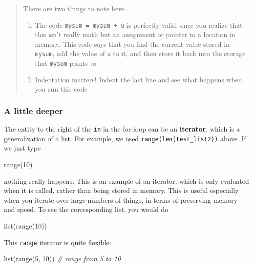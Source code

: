 \documentclass[
  letterpaper,
]{scrbook}
\newenvironment{Shaded}{\begin{snugshade}}{\end{snugshade}}
\newcommand{\BuiltInTok}[1]{#1}
\newcommand{\CommentTok}[1]{\textcolor[rgb]{0.56,0.35,0.01}{\textit{#1}}}
\newcommand{\DecValTok}[1]{\textcolor[rgb]{0.00,0.00,0.81}{#1}}
\newcommand{\NormalTok}[1]{#1}
\providecommand{\tightlist}{%
  \setlength{\itemsep}{0pt}\setlength{\parskip}{0pt}}
\begin{document}
\begin{quote}
There are two things to note here.

\begin{enumerate}
\def\labelenumi{\arabic{enumi}.}
\tightlist
\item
  The code \texttt{mysum\ =\ mysum\ +\ u} is perfectly valid, once you realize that this isn't really math but an assignment or pointer to a location in memory. This code says that you find the current value stored in \texttt{mysum}, add the value of \texttt{u} to it, and then store it back into the storage that \texttt{mysum} points to
\item
  Indentation matters! Indent the last line and see what happens when you run this code
\end{enumerate}
\end{quote}

\hypertarget{a-little-deeper}{%
\subsubsection{A little deeper}\label{a-little-deeper}}

The entity to the right of the \texttt{in} in the for-loop can be an \textbf{iterator}, which is a generalization of a list. For example, we used \texttt{range(len(test\_list2))} above. If we just type

\begin{Shaded}
\begin{Highlighting}[]
\BuiltInTok{range}\NormalTok{(}\DecValTok{10}\NormalTok{)}
\end{Highlighting}
\end{Shaded}

nothing really happens. This is an example of an iterator, which is only evaluated when it is called, rather than being stored in memory. This is useful especially when you iterate over large numbers of things, in terms of preserving memory and speed. To see the corresponding list, you would do

\begin{Shaded}
\begin{Highlighting}[]
\BuiltInTok{list}\NormalTok{(}\BuiltInTok{range}\NormalTok{(}\DecValTok{10}\NormalTok{))}
\end{Highlighting}
\end{Shaded}

This \texttt{range} iterator is quite flexible:

\begin{Shaded}
\begin{Highlighting}[]
\BuiltInTok{list}\NormalTok{(}\BuiltInTok{range}\NormalTok{(}\DecValTok{5}\NormalTok{, }\DecValTok{10}\NormalTok{))  }\CommentTok{\# range from 5 to 10}
\end{Highlighting}
\end{Shaded}
\end{document}
